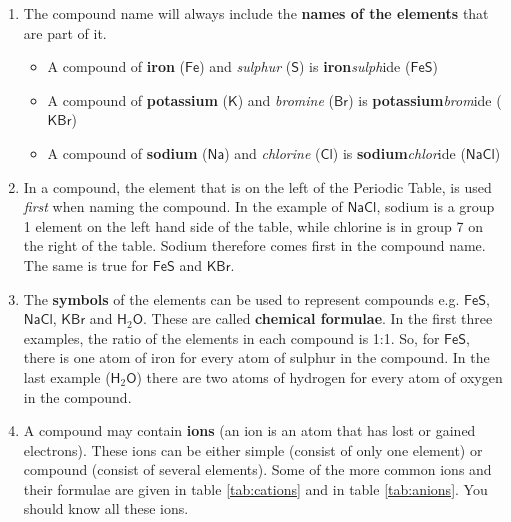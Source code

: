       \label{m38708*id64037}\begin{enumerate}[noitemsep, label=\textbf{\arabic*}. ] 
            \label{m38708*uid35}\item The compound name will always include the \textbf{names of the elements} that are part of it.
\label{m38708*id64059}\begin{itemize}[noitemsep]
            \label{m38708*uid36}\item A compound of \textbf{iron} ($\mathsf{Fe}$) and \textsl{sulphur} ($\mathsf{S}$) is \textbf{iron}\hspace{1ex}\textsl{sulph}ide ($\mathsf{FeS}$)
\label{m38708*uid37}\item A compound of \textbf{potassium} ($\mathsf{K}$) and \textsl{bromine} ($\mathsf{Br}$) is \textbf{potassium}\hspace{1ex}\textsl{brom}ide ($\mathsf{KBr}$)
\label{m38708*uid38}\item A compound of \textbf{sodium} ($\mathsf{Na}$) and \textsl{chlorine} ($\mathsf{Cl}$) is \textbf{sodium}\hspace{1ex}\textsl{chlor}ide ($\mathsf{NaCl}$)
\end{itemize}
        \label{m38708*uid39}\item In a compound, the element that is on the left of the Periodic Table, is used \textsl{first} when naming the compound. In the example of $\mathsf{NaCl}$, sodium is a group 1 element on the left hand side of the table, while chlorine is in group 7 on the right of the table. Sodium therefore comes first in the compound name. The same is true for $\mathsf{FeS}$ and $\mathsf{KBr}$.
\label{m38708*uid40}\item The \textbf{symbols} of the elements can be used to represent compounds e.g. $\mathsf{FeS}$, $\mathsf{NaCl}$, $\mathsf{KBr}$ and $\mathsf{H}{}_{2}\mathsf{O}$. These are called \textbf{chemical formulae}. In the first three examples, the ratio of the elements in each compound is 1:1. So, for $\mathsf{FeS}$, there is one atom of iron for every atom of sulphur in the compound. In the last example ($\mathsf{H}{}_{2}\mathsf{O}$) there are two atoms of hydrogen for every atom of oxygen in the compound.
\item A compound may contain \textbf{ions} (an ion is an atom that has lost or gained electrons). These ions can be either simple (consist of only one element) or compound (consist of several elements). Some of the more common ions and their formulae are given in table \ref{tab:cations} and in table \ref{tab:anions}. You should know all these ions.\\


\end{enumerate}
